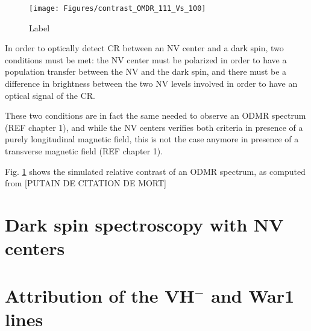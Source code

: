 \documentclass[a4paper]{report}
\begin{document}
\begin{figure}[h]
\centering
\texttt{[image: Figures/contrast\_OMDR\_111\_Vs\_100]}
\caption{Label}
\label{121 vs 22 contrast}
\end{figure}

In order to optically detect CR between an NV center and a dark spin, two conditions must be met: the NV center must be polarized in order to have a population transfer between the NV and the dark spin, and there must be a difference in brightness between the two NV levels involved in order to have an optical signal of the CR.

These two conditions are in fact the same needed to observe an ODMR spectrum (REF chapter 1), and while the NV centers verifies both criteria in presence of a purely longitudinal magnetic field, this is not the case anymore in presence of a transverse magnetic field (REF chapter 1).

Fig. \ref{121 vs 22 contrast} shows the simulated relative contrast of an ODMR spectrum, as computed from [PUTAIN DE CITATION DE MORT]

\section{Dark spin spectroscopy with NV centers}


\section{Attribution of the VH$^-$ and War1 lines}


\printbibliography
\end{document}
